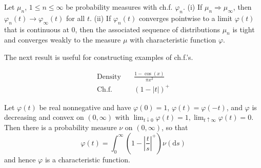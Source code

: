 \begin{theorem}
    Let $\mu_n$, $1\le n\le \infty$ be probability measures with ch.f. $\varphi_n$.\newline 
    (i) If $\mu_n\Longrightarrow \mu_\infty$, then $\varphi_n(t)\to\varphi_\infty(t)$ for all $t$.\newline 
    (ii) If $\varphi_n(t)$ converges pointwise to a limit $\varphi(t)$ that is continuous at $0$,
    then the associated sequence of distributions $\mu_n$ is tight and converges weakly to the measure $\mu$ with characteristic function $\varphi$.
\end{theorem}

The next result is useful for constructing examples of ch.f.'s.
\begin{example}
    \begin{align*}
        \text{Density}\quad& \frac{1-\cos(x)}{\pi x^2}   \\
        \text{Ch.f.}\quad& (1-\left|t\right|)^+
    \end{align*}

\end{example}
\begin{theorem}
    Let $\varphi(t)$ be real nonnegative and have $\varphi(0)=1$, $\varphi(t)=\varphi(-t)$, and $\varphi$ is decreasing and convex on $(0,\infty)$ with 
    $\lim_{t\downarrow 0}\varphi(t)=1,\lim_{t\uparrow\infty}\varphi(t)=0$. Then there is a probability measure $\nu$ on $(0,\infty)$, so that
    \[\varphi(t)=\int_0^\infty (1-\left|\frac{t}{s}\right|^+)\nu(\mathrm{d}s)\] 
    and hence $\varphi$ is a characteristic function.
\end{theorem}

